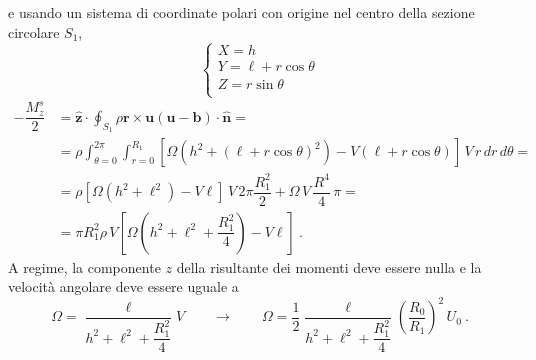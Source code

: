 e usando un sistema di coordinate polari con origine nel centro della sezione circolare $S_1$,
\begin{equation}
\begin{cases}
 X = h \\
 Y = \ell + r \cos\theta \\
 Z = r \sin\theta \\
\end{cases}
\end{equation}
\begin{equation}
\begin{aligned}
 - \dfrac{M_z^s}{2} & = \bm{\hat{z}} \cdot \oint_{S_1} \rho \bm{r} \times \bm{u} \left( \bm{u} - \bm{b} \right) \cdot \bm{\hat{n}} = \\
  & = \rho \int_{\theta=0}^{2\pi}\int_{r=0}^{R_1}
    \left[ \Omega\left( h^2 + (\ell + r \cos\theta)^2 \right) - V \left( \ell + r \cos \theta \right)  \right] \, V \,  r \, dr \, d\theta = \\
  & = \rho \left[ \Omega \left( h^2 + \ell^2 \right) - V \ell \right] \, V \, 2 \pi \dfrac{R_1^2}{2} +
   \Omega \, V \, \dfrac{R^4}{4}\, \pi = \\
 & = \pi R_1^2 \rho \, V \left[ \Omega \left( h^2 + \ell^2 + \dfrac{R_1^2}{4} \right) - V \ell \right] \ .
\end{aligned}
\end{equation}
A regime, la componente $z$ della risultante dei momenti deve essere nulla e la velocità angolare deve essere uguale a
\begin{equation}
 \Omega = \dfrac{\ell}{h^2 + \ell^2 + \dfrac{R_1^2}{4}} V
 \qquad \rightarrow \qquad
 \Omega = \dfrac{1}{2}\dfrac{\ell}{h^2 + \ell^2 + \dfrac{R_1^2}{4}} \left( \dfrac{R_0}{R_1} \right)^2 \, U_0 \ .
\end{equation}
